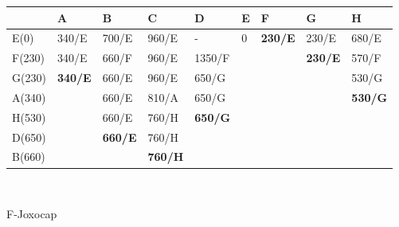 \documentclass[12pt]{article}
\begin{document}
\begin{enumerate}
\begin{center}
\begin{tabular}{|l|ll|l|lllll}
\hline
 & \multicolumn{1}{l|}{A} & B & C & \multicolumn{1}{l|}{D} & \multicolumn{1}{l|}{E} & \multicolumn{1}{l|}{F} & \multicolumn{1}{l|}{G} & \multicolumn{1}{l|}{H} \\ \hline
E(0) & \multicolumn{1}{l|}{340/E} & 700/E & 960/E & \multicolumn{1}{l|}{-} & \multicolumn{1}{l|}{0} & \multicolumn{1}{l|}{\textbf{230/E}} & \multicolumn{1}{l|}{230/E} & \multicolumn{1}{l|}{680/E} \\ \hline
F(230) & \multicolumn{1}{l|}{340/E} & 660/F & 960/E & \multicolumn{1}{l|}{1350/F} &  & \multicolumn{1}{l|}{} & \multicolumn{1}{l|}{\textbf{230/E}} & \multicolumn{1}{l|}{570/F} \\ \cline{1-5} \cline{8-9} 
G(230) & \multicolumn{1}{l|}{\textbf{340/E}} & 660/E & 960/E & \multicolumn{1}{l|}{650/G} &  &  & \multicolumn{1}{l|}{} & \multicolumn{1}{l|}{530/G} \\ \cline{1-5} \cline{9-9} 
A(340) & \multicolumn{1}{l|}{\textbf{}} & 660/E & 810/A & \multicolumn{1}{l|}{650/G} &  &  & \multicolumn{1}{l|}{} & \multicolumn{1}{l|}{\textbf{530/G}} \\ \cline{1-1} \cline{3-5} \cline{9-9} 
H(530) & \multicolumn{1}{l|}{} & 660/E & 760/H & \multicolumn{1}{l|}{\textbf{650/G}} &  &  & \textbf{} &  \\ \cline{1-1} \cline{3-5}
D(650) & \multicolumn{1}{l|}{} & \textbf{660/E} & 760/H &  &  &  &  &  \\ \cline{1-1} \cline{3-4}
B(660) & \textbf{} &  & \textbf{760/H} &  &  & \textbf{} &  &  \\ \cline{1-1} \cline{4-4}
\end{tabular}
\\
      \vspace{0.5cm}
      \newpage
      
       F-Joxocap
       

\end{center}
\end{enumerate}
\end{document}

